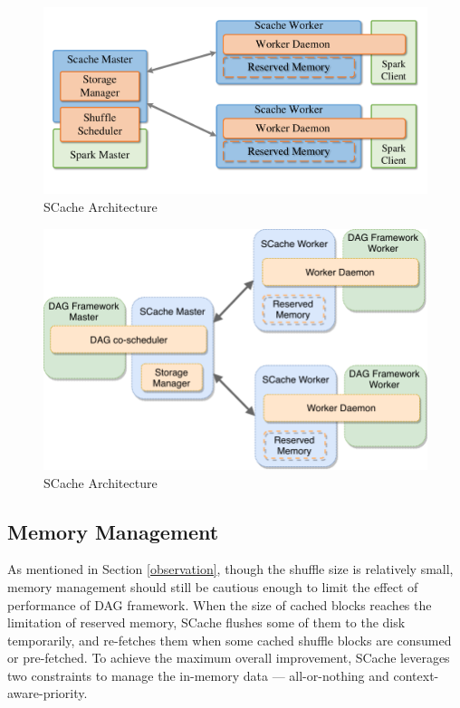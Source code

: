 \begin{figure}
	\centering
	\includegraphics[width=0.8\linewidth]{fig/arch}
	\caption{\color{red}SCache Architecture}
	\label{fig:arch}
	\vspace{-0.5em}
\end{figure}

\begin{figure}
	\centering
	\includegraphics[width=0.8\linewidth]{fig/architecture}
	\caption{\color{blue}SCache Architecture}
	\label{fig:architecture}
\end{figure}

\subsection{Memory Management}\label{memorymanage}
As mentioned in Section \ref{observation}, though the shuffle size is relatively small, memory management should still be cautious enough to limit the effect of performance of DAG framework.
When the size of cached blocks reaches the limitation of reserved memory, SCache flushes some of them to the disk temporarily, and re-fetches them when some cached shuffle blocks are consumed or pre-fetched. To achieve the maximum overall improvement, SCache leverages two constraints to manage the in-memory data --- all-or-nothing and context-aware-priority.

